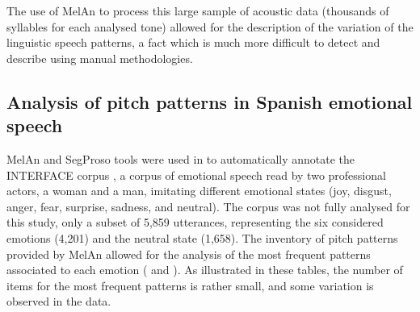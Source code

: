 \documentclass[output=paper]{langsci/langscibook}
\begin{document}
\largerpage[2.5]The use of MelAn to process this large sample of acoustic data (thousands of syllables for each analysed tone) allowed for the description of the  variation of the linguistic speech patterns, a fact which is much more difficult to detect and describe using manual methodologies.\largerpage

\subsection{Analysis of pitch patterns in Spanish emotional speech} 

MelAn and SegProso tools were used in \citet{Garrido2011} to automatically annotate the INTERFACE corpus \citep{Hozjan2002}, a corpus of  emotional speech read by two professional actors, a woman and a man, imitating different emotional states (joy, disgust, anger, fear, surprise, sadness, and neutral). The corpus was not fully analysed for this study, only a subset of 5,859 utterances, representing the six considered emotions (4,201) and the neutral state (1,658).  The inventory of pitch patterns provided by MelAn allowed for the analysis of the most frequent patterns associated to each emotion ( and ). As illustrated in these tables, the number of items for the most frequent patterns is rather small, and some variation is observed in the data. 
\end{document}
